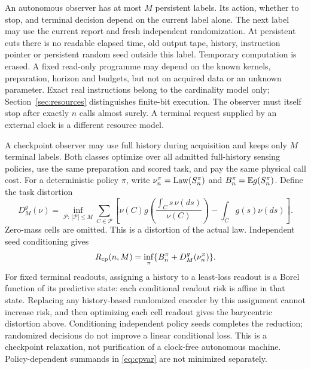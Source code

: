 An autonomous observer has at most $M$ persistent labels. Its action, whether to stop, and terminal decision depend on the current label alone. The next label may use the current report and fresh independent randomization. At persistent cuts there is no readable elapsed time, old output tape, history, instruction pointer or persistent random seed outside this label. Temporary computation is erased. A fixed read-only programme may depend on the known kernels, preparation, horizon and budgets, but not on acquired data or an unknown parameter. Exact real instructions belong to the cardinality model only; Section~\ref{sec:resources} distinguishes finite-bit execution. The observer must itself stop after exactly $n$ calls almost surely. A terminal request supplied by an external clock is a different resource model.

A checkpoint observer may use full history during acquisition and keeps only $M$ terminal labels. Both classes optimize over all admitted full-history sensing policies, use the same preparation and scored task, and pay the same physical call cost. For a deterministic policy $\pi$, write $\nu_n^\pi=\operatorname{Law}(S_n^\pi)$ and $B_n^\pi=\mathbb E g(S_n^\pi)$. Define the task distortion
\begin{equation}\label{eq:taskdist}
 D_M^g(\nu)=\inf_{\mathcal P:\,|\mathcal P|\le M}
 \sum_{C\in\mathcal P}\left[\nu(C)g\!\left(\frac{\int_Cs\,\nu(ds)}{\nu(C)}\right)-\int_C g(s)\nu(ds)\right].
\end{equation}
Zero-mass cells are omitted. This is a distortion of the actual law. Independent seed conditioning gives
\begin{equation}\label{eq:cpvar}
 R_{\mathrm{cp}}(n,M)=\inf_\pi\{B_n^\pi+D_M^g(\nu_n^\pi)\}.
\end{equation}
For fixed terminal readouts, assigning a history to a least-loss readout is a Borel function of its predictive state: each conditional readout risk is affine in that state. Replacing any history-based randomized encoder by this assignment cannot increase risk, and then optimizing each cell readout gives the barycentric distortion above. Conditioning independent policy seeds completes the reduction; randomized decisions do not improve a linear conditional loss. This is a checkpoint relaxation, not purification of a clock-free autonomous machine. Policy-dependent summands in \eqref{eq:cpvar} are not minimized separately.
